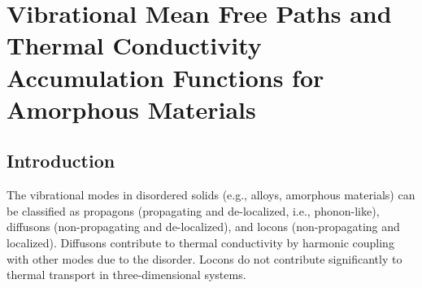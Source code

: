 \chapter{\label{chapter:mfp}Vibrational Mean Free Paths and Thermal 
Conductivity Accumulation Functions for Amorphous Materials}

\section{\label{S:Introduction}Introduction}


The vibrational modes in disordered solids (e.g., alloys, 
amorphous materials) can be 
classified as propagons (propagating and de-localized, 
i.e., phonon-like), diffusons (non-propagating and 
de-localized), and locons (non-propagating and localized).
\cite{allen_thermal_1993,allen_diffusons_1999} 
Diffusons contribute to thermal conductivity by harmonic coupling 
with other modes due to the disorder. Locons do not contribute 
significantly to thermal transport in three-dimensional systems.
\cite{leitner_vibrational_2001}

